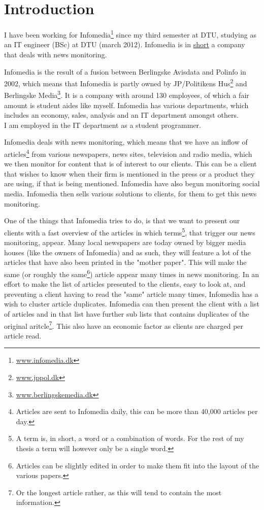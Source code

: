 \chapter{Introduction}
I have been working for Infomedia\footnote{\url{www.infomedia.dk}} since my third semester at DTU, studying as an IT engineer (BSc) at DTU (march 2012). Infomedia is in \underline{short} a company that deals with news monitoring.

Infomedia is the result of a fusion between Berlingske Avisdata and Polinfo in 2002, which means that Infomedia is partly owned by JP/Politikens Hus\footnote{\url{www.jppol.dk}} and Berlingske Media\footnote{\url{www.berlingskemedia.dk}}. It is a company with around 130 employees, of which a fair amount is student aides like myself. Infomedia has various departments, which includes an economy, sales, analysis and an IT department amongst others.\\
I am employed in the IT department as a student programmer.

Infomedia deals with news monitoring, which means that we have an inflow of articles\footnote{Articles are sent to Infomedia daily, this can be more than 40,000 articles per day.} from various newspapers, news sites, television and radio media, which we then monitor for content that is of interest to our clients. This can be a client that wishes to know when their firm is mentioned in the press or a product they are using, if that is being mentioned. Infomedia have also begun monitoring social media. Infomedia then sells various solutions to clients, for them to get this news monitoring.

One of the things that Infomedia tries to do, is that we want to present our clients with a fast overview of the articles in which terms\footnote{A term is, in short, a word or a combination of words. For the rest of my thesis a term will however only be a single word.}, that trigger our news monitoring, appear. Many local newspapers are today owned by bigger media houses (like the owners of Infomedia) and as such, they will feature a lot of the articles that have also been printed in the "mother paper". This will make the same (or roughly the same\footnote{Articles can be slightly edited in order to make them fit into the layout of the various papers.}) article appear many times in news monitoring. In an effort to make the list of articles presented to the clients, easy to look at, and preventing a client having to read the "same" article many times, Infomedia has a wish to cluster article duplicates. Infomedia can then present the client with a list of articles and in that list have further sub lists that contains duplicates of the original aritcle\footnote{Or the longest article rather, as this will tend to contain the most information.}. This also have an economic factor as clients are charged per article read.

